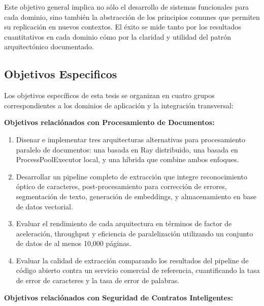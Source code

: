 \documentclass[12pt,a4paper,twoside]{book}
\begin{document}
Este objetivo general implica no sólo el desarrollo de sistemas funcionales para cada dominio, sino también la abstracción de los principios comunes que permiten su replicación en nuevos contextos. El éxito se mide tanto por los resultados cuantitativos en cada dominio cómo por la claridad y utilidad del patrón arquitectónico documentado.

\subsection{Objetivos Especificos}

Los objetivos específicos de esta tesis se organizan en cuatro grupos correspondientes a los dominios de aplicación y la integración transversal:

\textbf{Objetivos relaciónados con Procesamiento de Documentos:}

\begin{enumerate}[label=\textbf{OE1.\arabic*.}]
    \item Disenar e implementar tres arquitecturas alternativas para procesamiento paralelo de documentos: una basada en Ray distribuido, una basada en ProcessPoolExecutor local, y una híbrida que combine ambos enfoques.
    
    \item Desarrollar un pipeline completo de extracción que integre reconocimiento óptico de caracteres, post-procesamiento para corrección de errores, segmentación de texto, generación de embeddings, y almacenamiento en base de datos vectorial.
    
    \item Evaluar el rendimiento de cada arquitectura en términos de factor de aceleración, throughput y eficiencia de paralelización utilizando un conjunto de datos de al menos 10,000 páginas.
    
    \item Evaluar la calidad de extracción comparando los resultados del pipeline de código abierto contra un servicio comercial de referencia, cuantificando la tasa de error de caracteres y la tasa de error de palabras.
\end{enumerate}

\textbf{Objetivos relaciónados con Seguridad de Contratos Inteligentes:}
\end{document}
